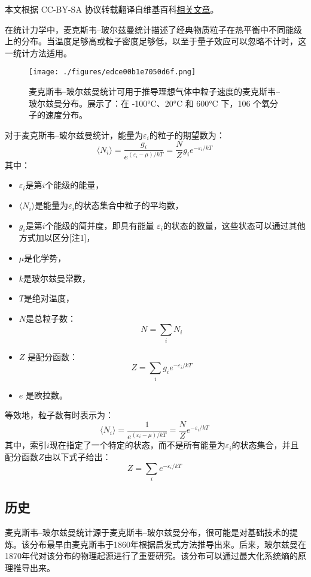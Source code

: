 
本文根据 CC-BY-SA 协议转载翻译自维基百科\href{https://en.wikipedia.org/wiki/Maxwell\%E2\%80\%93Boltzmann_statistics}{相关文章}。

在统计力学中，麦克斯韦–玻尔兹曼统计描述了经典物质粒子在热平衡中不同能级上的分布。当温度足够高或粒子密度足够低，以至于量子效应可以忽略不计时，这一统计方法适用。
\begin{figure}[ht]
\centering
\texttt{[image: ./figures/edce00b1e7050d6f.png]}
\caption{麦克斯韦–玻尔兹曼统计可用于推导理想气体中粒子速度的麦克斯韦–玻尔兹曼分布。展示了：在 -100°C、20°C 和 600°C 下，106 个氧分子的速度分布。} \label{fig_MBTJ_1}
\end{figure}
对于麦克斯韦–玻尔兹曼统计，能量为\(\varepsilon_i\)的粒子的期望数为：
\[
\langle N_i \rangle = \frac{g_i}{e^{(\varepsilon_i - \mu) / kT}} = \frac{N}{Z} g_i e^{-\varepsilon_i / kT}~
\]
其中：
\begin{itemize}
\item \(\varepsilon_i\)是第\( i \)个能级的能量，
\item \( \langle N_i \rangle \)是能量为\( \varepsilon_i \)的状态集合中粒子的平均数，
\item \( g_i \)是第\( i \)个能级的简并度，即具有能量 \( \varepsilon_i \)的状态的数量，这些状态可以通过其他方式加以区分[注1]，
\item \( \mu \)是化学势，
\item \( k \)是玻尔兹曼常数，
\item \( T \)是绝对温度，
\item \( N \)是总粒子数：
  \[
  N = \sum_i N_i~
  \]
\item \( Z \) 是配分函数：
  \[
  Z = \sum_i g_i e^{-\varepsilon_i / kT}~
  \]
\item \( e \) 是欧拉数。
\end{itemize}
等效地，粒子数有时表示为：
\[
\langle N_i \rangle = \frac{1}{e^{(\varepsilon_i - \mu) / kT}} = \frac{N}{Z} e^{-\varepsilon_i / kT}~
\]
其中，索引\( i \)现在指定了一个特定的状态，而不是所有能量为\( \varepsilon_i \)的状态集合，并且配分函数\( Z \)由以下式子给出：
\[
Z = \sum_i e^{-\varepsilon_i / kT}~
\]
\subsection{历史}  
麦克斯韦–玻尔兹曼统计源于麦克斯韦–玻尔兹曼分布，很可能是对基础技术的提炼。该分布最早由麦克斯韦于1860年根据启发式方法推导出来。后来，玻尔兹曼在1870年代对该分布的物理起源进行了重要研究。该分布可以通过最大化系统熵的原理推导出来。
